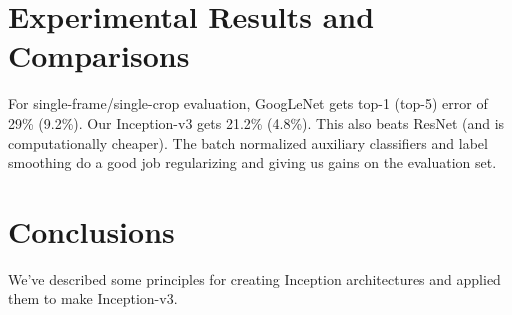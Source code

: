 \documentclass[a4paper]{article}
\begin{document}
\section{Experimental Results and Comparisons}
For single-frame/single-crop evaluation, GoogLeNet gets top-1 (top-5) error of
29\% (9.2\%). Our Inception-v3 gets 21.2\% (4.8\%). This also beats ResNet (and
is computationally cheaper). The batch normalized auxiliary classifiers and
label smoothing do a good job regularizing and giving us gains on the evaluation
set.

\section{Conclusions}
We've described some principles for creating Inception architectures and applied
them to make Inception-v3.
\end{document}
